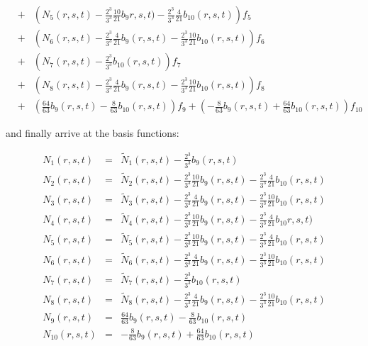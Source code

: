 \begin{eqnarray}
&+&\left( N_5(r,s,t)- \frac{2^3}{3^3}\frac{10}{21} b_{9}r,s,t) -\frac{2^3}{3^3}\frac{4}{21} b_{10}(r,s,t) \right) f_5 \nonumber\\
&+&\left( N_6(r,s,t) -\frac{2^3}{3^3}\frac{4}{21} b_9(r,s,t) -\frac{2^3}{3^3}\frac{10}{21} b_{10}(r,s,t) \right) f_6 \nonumber\\
&+&\left( N_7(r,s,t) - \frac{2^3}{3^3}b_{10}(r,s,t) \right) f_7 \nonumber\\
&+&\left(N_8(r,s,t) -\frac{2^3}{3^3}\frac{4}{21} b_9(r,s,t) -\frac{2^3}{3^3}\frac{10}{21} b_{10}(r,s,t) \right) f_8 \nonumber\\
&+& \left(  \frac{64}{63}b_9(r,s,t) -\frac{8}{63} b_{10}(r,s,t) \right) f_9 
+ \left( -\frac{8}{63} b_{9}(r,s,t)  + \frac{64}{63}b_{10}(r,s,t) \right) f_{10} 
\end{eqnarray}

and finally arrive at the basis functions:
\begin{mdframed}[backgroundcolor=blue!5]
\begin{eqnarray}
N_1(r,s,t)    &=&  \tilde{N}_1(r,s,t) - \frac{2^3}{3^3}b_9(r,s,t)      \nonumber\\
N_2(r,s,t)    &=&  \tilde{N}_2(r,s,t) - \frac{2^3}{3^3}\frac{10}{21} b_9(r,s,t) - \frac{2^3}{3^3}\frac{4}{21} b_{10}(r,s,t)      \nonumber\\
N_3(r,s,t)    &=&  \tilde{N}_3(r,s,t)  -\frac{2^3}{3^3}\frac{4}{21} b_9(r,s,t) -\frac{2^3}{3^3}\frac{10}{21} b_{10}(r,s,t)      \nonumber\\
N_4(r,s,t)    &=&  \tilde{N}_4(r,s,t) -\frac{2^3}{3^3}\frac{10}{21} b_{9}(r,s,t) -\frac{2^3}{3^3}\frac{4}{21} b_{10}r,s,t)      \nonumber\\
N_5(r,s,t)    &=&  \tilde{N}_5(r,s,t)- \frac{2^3}{3^3}\frac{10}{21} b_{9}(r,s,t) -\frac{2^3}{3^3}\frac{4}{21} b_{10}(r,s,t)      \nonumber\\
N_6(r,s,t)    &=&  \tilde{N}_6(r,s,t) -\frac{2^3}{3^3}\frac{4}{21} b_9(r,s,t) -\frac{2^3}{3^3}\frac{10}{21} b_{10}(r,s,t)      \nonumber\\
N_7(r,s,t)    &=&  \tilde{N}_7(r,s,t) - \frac{2^3}{3^3}b_{10}(r,s,t)      \nonumber\\
N_8(r,s,t)    &=&  \tilde{N}_8(r,s,t) -\frac{2^3}{3^3}\frac{4}{21} b_9(r,s,t) -\frac{2^3}{3^3}\frac{10}{21} b_{10}(r,s,t)      \nonumber\\
N_9(r,s,t)    &=&  \frac{64}{63}b_9(r,s,t) -\frac{8}{63} b_{10}(r,s,t)      \nonumber\\
N_{10}(r,s,t) &=&  -\frac{8}{63} b_{9}(r,s,t)  + \frac{64}{63}b_{10}(r,s,t)       \nonumber
\end{eqnarray}
\end{mdframed}

